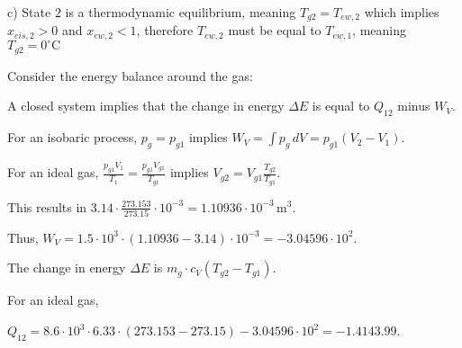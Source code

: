 c) State 2 is a thermodynamic equilibrium, meaning \( T_{g2} = T_{ew,2} \) which implies \( x_{eis,2} > 0 \) and \( x_{ew,2} < 1 \), therefore \( T_{ew,2} \) must be equal to \( T_{ew,1} \), meaning \( T_{g2} = 0^\circ \text{C} \)

Consider the energy balance around the gas:

A closed system implies that the change in energy \( \Delta E \) is equal to \( Q_{12} \) minus \( W_V \).

For an isobaric process, \( p_g = p_{g1} \) implies \( W_V = \int p_g \, dV = p_{g1} (V_2 - V_1) \).

For an ideal gas, \( \frac{p_{g1} V_1}{T_1} = \frac{p_{g1} V_{g1}}{T_{g1}} \) implies \( V_{g2} = V_{g1} \frac{T_{g2}}{T_{g1}} \).

This results in \( 3.14 \cdot \frac{273.153}{273.15} \cdot 10^{-3} = 1.10936 \cdot 10^{-3} \, \text{m}^3 \).

Thus, \( W_V = 1.5 \cdot 10^3 \cdot (1.10936 - 3.14) \cdot 10^{-3} = -3.04596 \cdot 10^2 \).

The change in energy \( \Delta E \) is \( m_g \cdot c_V (T_{g2} - T_{g1}) \).

For an ideal gas,

\( Q_{12} = 8.6 \cdot 10^3 \cdot 6.33 \cdot (273.153 - 273.15) - 3.04596 \cdot 10^2 = -1.4143.99 \).